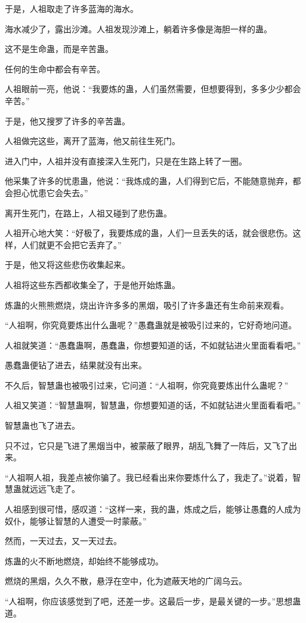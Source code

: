 \begin{this_body}
于是，人祖取走了许多蓝海的海水。

海水减少了，露出沙滩。人祖发现沙滩上，躺着许多像是海胆一样的蛊。

这不是生命蛊，而是辛苦蛊。

任何的生命中都会有辛苦。

人祖眼前一亮，他说：“我要炼的蛊，人们虽然需要，但想要得到，多多少少都会辛苦。”

于是，他又搜罗了许多的辛苦蛊。

人祖做完这些，离开了蓝海，他又前往生死门。

进入门中，人祖并没有直接深入生死门，只是在生路上转了一圈。

他采集了许多的忧患蛊，他说：“我炼成的蛊，人们得到它后，不能随意抛弃，都会担心忧患它会失去。”

离开生死门，在路上，人祖又碰到了悲伤蛊。

人祖开心地大笑：“好极了，我要炼成的蛊，人们一旦丢失的话，就会很悲伤。这样，人们就更不会把它丢弃了。”

于是，他又将这些悲伤收集起来。

人祖将这些东西都收集全了，于是他开始炼蛊。

炼蛊的火熊熊燃烧，烧出许许多多的黑烟，吸引了许多蛊还有生命前来观看。

“人祖啊，你究竟要炼出什么蛊呢？”愚蠢蛊就是被吸引过来的，它好奇地问道。

人祖就笑道：“愚蠢蛊啊，愚蠢蛊，你想要知道的话，不如就钻进火里面看看吧。”

愚蠢蛊便钻了进去，结果就没有出来。

不久后，智慧蛊也被吸引过来，它问道：“人祖啊，你究竟要炼出什么蛊呢？”

人祖又笑道：“智慧蛊啊，智慧蛊，你想要知道的话，不如就钻进火里面看看吧。”

智慧蛊也飞了进去。

只不过，它只是飞进了黑烟当中，被蒙蔽了眼界，胡乱飞舞了一阵后，又飞了出来。

“人祖啊人祖，我差点被你骗了。我已经看出来你要炼什么了，我走了。”说着，智慧蛊就远远飞走了。

人祖感到很可惜，感叹道：“这样一来，我的蛊，炼成之后，能够让愚蠢的人成为奴仆，能够让智慧的人遭受一时蒙蔽。”

然而，一天过去，又一天过去。

炼蛊的火不断地燃烧，却始终不能够成功。

燃烧的黑烟，久久不散，悬浮在空中，化为遮蔽天地的广阔乌云。

“人祖啊，你应该感觉到了吧，还差一步。这最后一步，是最关键的一步。”思想蛊道。


\end{this_body}
